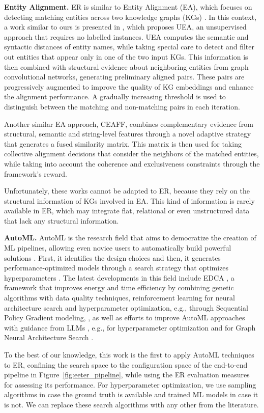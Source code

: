 {
\textbf{Entity Alignment.} ER is similar to Entity Alignment (EA), which focuses on detecting matching entities across two knowledge graphs (KGs) \cite{DBLP:books/sp/ZhaoZT23}. In this context, a work similar to ours is presented in \cite{DBLP:conf/dasfaa/ZengZTLLZ21}, which proposes \textsf{UEA}, an unsupervised approach that requires no labelled instances. \textsf{UEA} computes the semantic and syntactic distances of entity names, while taking special care to detect and filter out entities that appear only in one of the two input KGs. This information is then combined with structural evidence about neighboring entities from graph convolutional networks, generating preliminary aligned pairs. These pairs are progressively augmented to improve the quality of KG embeddings and enhance the alignment performance. A gradually increasing threshold is used to distinguish between the matching and non-matching pairs in each iteration.

Another similar EA approach,  CEAFF\cite{DBLP:journals/tois/ZengZTLG21}, combines complementary evidence from structural, semantic and string-level features through a novel adaptive strategy that generates a fused similarity matrix. This matrix is then used for taking collective alignment decisions that consider the neighbors of the matched entities, while taking into account the coherence and exclusiveness constraints through the framework's reward.

Unfortunately, these works cannot be adapted to ER, because they rely on the structural information of KGs involved in EA. This kind of information is rarely available in ER, which may integrate flat, relational or even unstructured data that lack any structural information.

\textbf{AutoML.} AutoML is the research field that aims to democratize the creation of ML pipelines, allowing even novice users to automatically build powerful solutions \cite{DBLP:books/sp/HKV2019}. First, it identifies the design choices and then, it generates performance-optimized models through a search strategy that optimizes hyperparameters \cite{DBLP:journals/air/BaratchiWLRHBO24}. The latest developments in this field include EDCA \cite{DBLP:conf/evoapps/SimoesC25}, a framework that improves energy and time efficiency by combining genetic algorithms with data quality techniques,  reinforcement learning for neural architecture search and hyperparameter optimization, e.g., through Sequential Policy Gradient modeling, \cite{DBLP:journals/corr/abs-2506-15051}, as well as efforts to improve AutoML approaches with guidance from LLMs \cite{DBLP:journals/tmlr/TornedeDEGMRSTT24}, e.g., for hyperparameter optimization \cite{DBLP:journals/corr/abs-2312-04528} and for Graph Neural Architecture Search \cite{DBLP:journals/corr/abs-2502-10459}. 

To the best of our knowledge, this work is the first to apply AutoML techniques to ER,  confining the search space to the configuration space of the end-to-end pipeline in Figure~\ref{fig:eeter_pipeline}, while using the ER evaluation measures for assessing its performance. For hyperparameter optimization, we use sampling algorithms in case the ground truth is available and trained ML models in case it is not. We can replace these search algorithms with any other from the literature.
}
